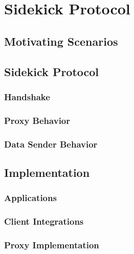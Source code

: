 \chapter{Sidekick Protocol}
\section{Motivating Scenarios}

\section{Sidekick Protocol}
\subsection{Handshake}
\subsection{Proxy Behavior}
\subsection{Data Sender Behavior}

\section{Implementation}

\subsection{Applications}
\subsection{Client Integrations}
\subsection{Proxy Implementation}


